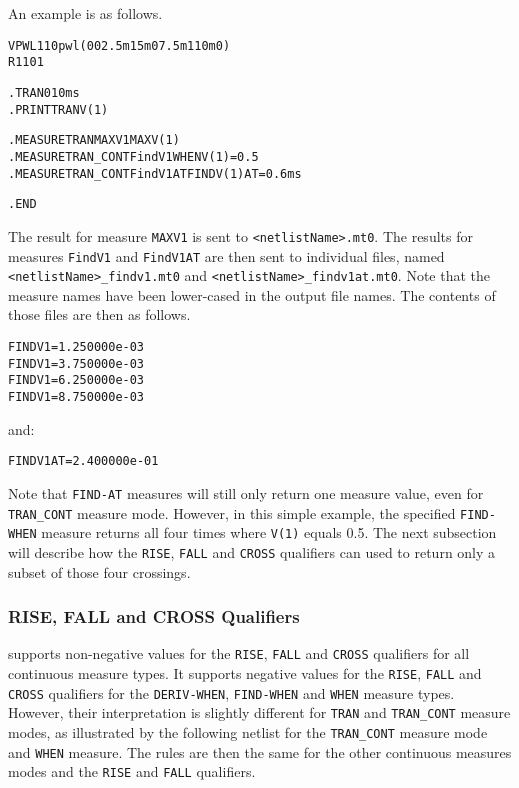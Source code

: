 An example is as follows.

\begin{alltt}
VPWL1 1 0 pwl(0 0 2.5m 1 5m 0 7.5m 1 10m 0)
R1 1 0 1

.TRAN 0 10ms
.PRINT TRAN V(1)

.MEASURE TRAN MAXV1 MAX V(1)
.MEASURE TRAN_CONT FindV1 WHEN V(1)=0.5
.MEASURE TRAN_CONT FindV1AT FIND V(1) AT=0.6ms

.END
\end{alltt}

The result for measure \texttt{MAXV1} is sent to \texttt{<netlistName>.mt0}. The
results for measures \texttt{FindV1} and \texttt{FindV1AT} are then sent to individual
files, named \texttt{<netlistName>\_findv1.mt0} and \texttt{<netlistName>\_findv1at.mt0}.
Note that the measure names have been lower-cased in the output file names.  The contents
of those files are then as follows.

\begin{alltt}
FINDV1 = 1.250000e-03
FINDV1 = 3.750000e-03
FINDV1 = 6.250000e-03
FINDV1 = 8.750000e-03
\end{alltt}

and:

\begin{alltt}
FINDV1AT = 2.400000e-01
\end{alltt}

Note that \texttt{FIND-AT} measures will still only return one measure value, even for
\texttt{TRAN\_CONT} measure mode.  However, in this simple example, the specified
\texttt{FIND-WHEN} measure returns all four times where \texttt{V(1)} equals 0.5.
The next subsection will describe how the \texttt{RISE}, \texttt{FALL} and \texttt{CROSS}
qualifiers can used to return only a subset of those four crossings.

\subsubsection{RISE, FALL and CROSS Qualifiers}
\label{Measure_CONT_RFC}
\Xyce{} supports non-negative values for the \texttt{RISE}, \texttt{FALL}
and \texttt{CROSS} qualifiers for all continuous measure types.  It supports
negative values for the \texttt{RISE}, \texttt{FALL} and \texttt{CROSS} qualifiers
for the \texttt{DERIV-WHEN}, \texttt{FIND-WHEN} and \texttt{WHEN} measure types.
However, their interpretation is slightly different for
\texttt{TRAN} and \texttt{TRAN\_CONT} measure modes, as illustrated by the following
netlist for the \texttt{TRAN\_CONT} measure mode and \texttt{WHEN} measure. The rules
are then the same for the other continuous measures modes and the \texttt{RISE} and
\texttt{FALL} qualifiers.

